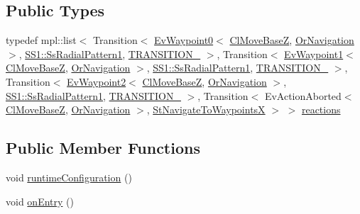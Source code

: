 \subsection*{Public Types}
\begin{DoxyCompactItemize}
\item 
typedef mpl\+::list$<$ Transition$<$ \hyperlink{structmove__base__z__client_1_1EvWaypoint0}{Ev\+Waypoint0}$<$ \hyperlink{classmove__base__z__client_1_1ClMoveBaseZ}{Cl\+Move\+BaseZ}, \hyperlink{classsm__dance__bot__2_1_1OrNavigation}{Or\+Navigation} $>$, \hyperlink{structsm__dance__bot__2_1_1SS1_1_1SsRadialPattern1}{S\+S1\+::\+Ss\+Radial\+Pattern1}, \hyperlink{structsm__dance__bot__2_1_1StNavigateToWaypointsX_1_1TRANSITION__1}{T\+R\+A\+N\+S\+I\+T\+I\+O\+N\+\_} $>$, Transition$<$ \hyperlink{structmove__base__z__client_1_1EvWaypoint1}{Ev\+Waypoint1}$<$ \hyperlink{classmove__base__z__client_1_1ClMoveBaseZ}{Cl\+Move\+BaseZ}, \hyperlink{classsm__dance__bot__2_1_1OrNavigation}{Or\+Navigation} $>$, \hyperlink{structsm__dance__bot__2_1_1SS1_1_1SsRadialPattern1}{S\+S1\+::\+Ss\+Radial\+Pattern1}, \hyperlink{structsm__dance__bot__2_1_1StNavigateToWaypointsX_1_1TRANSITION__2}{T\+R\+A\+N\+S\+I\+T\+I\+O\+N\+\_} $>$, Transition$<$ \hyperlink{structmove__base__z__client_1_1EvWaypoint2}{Ev\+Waypoint2}$<$ \hyperlink{classmove__base__z__client_1_1ClMoveBaseZ}{Cl\+Move\+BaseZ}, \hyperlink{classsm__dance__bot__2_1_1OrNavigation}{Or\+Navigation} $>$, \hyperlink{structsm__dance__bot__2_1_1SS1_1_1SsRadialPattern1}{S\+S1\+::\+Ss\+Radial\+Pattern1}, \hyperlink{structsm__dance__bot__2_1_1StNavigateToWaypointsX_1_1TRANSITION__3}{T\+R\+A\+N\+S\+I\+T\+I\+O\+N\+\_} $>$, Transition$<$ Ev\+Action\+Aborted$<$ \hyperlink{classmove__base__z__client_1_1ClMoveBaseZ}{Cl\+Move\+BaseZ}, \hyperlink{classsm__dance__bot__2_1_1OrNavigation}{Or\+Navigation} $>$, \hyperlink{structsm__dance__bot__2_1_1StNavigateToWaypointsX}{St\+Navigate\+To\+WaypointsX} $>$ $>$ \hyperlink{structsm__dance__bot__2_1_1StNavigateToWaypointsX_a324e1d36077605571edf69adac5e7d26}{reactions}
\end{DoxyCompactItemize}
\subsection*{Public Member Functions}
\begin{DoxyCompactItemize}
\item 
void \hyperlink{structsm__dance__bot__2_1_1StNavigateToWaypointsX_a226fdf0f0d5ec874fd769ffbeb5c8d30}{runtime\+Configuration} ()
\item 
void \hyperlink{structsm__dance__bot__2_1_1StNavigateToWaypointsX_a57b8b85e63f37bbbc84049126fb4cf9a}{on\+Entry} ()
\end{DoxyCompactItemize}
